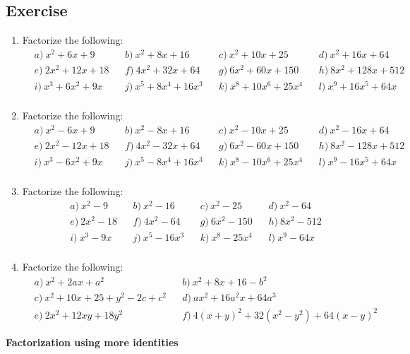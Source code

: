 \documentclass[12pt]{article}
\begin{document}
    \subsection*{Exercise}
    \begin{enumerate}
        \item Factorize the following:\begin{align*}
            &a)\ x^2+6x+9&&b)\ x^2+8x+16&&c)\ x^2+10x+25&&d)\ x^2+16x+64\\
            &e)\ 2x^2+12x+18&&f)\ 4x^2+32x+64&&g)\ 6x^2+60x+150&&h)\ 8x^2+128x+512\\
            &i)\ x^3+6x^2+9x&&j)\ x^5+8x^4+16x^3&&k)\ x^8+10x^6+25x^4&&l)\ x^9+16x^5+64x\\
        \end{align*}
        \item Factorize the following:\begin{align*}
            &a)\ x^2-6x+9&&b)\ x^2-8x+16&&c)\ x^2-10x+25&&d)\ x^2-16x+64\\
            &e)\ 2x^2-12x+18&&f)\ 4x^2-32x+64&&g)\ 6x^2-60x+150&&h)\ 8x^2-128x+512\\
            &i)\ x^3-6x^2+9x&&j)\ x^5-8x^4+16x^3&&k)\ x^8-10x^6+25x^4&&l)\ x^9-16x^5+64x\\
        \end{align*}
        \item Factorize the following:\begin{align*}
            &a)\ x^2-9&&b)\ x^2-16&&c)\ x^2-25&&d)\ x^2-64\\
            &e)\ 2x^2-18&&f)\ 4x^2-64&&g)\ 6x^2-150&&h)\ 8x^2-512\\
            &i)\ x^3-9x&&j)\ x^5-16x^3&&k)\ x^8-25x^4&&l)\ x^9-64x\\
        \end{align*}
        \item Factorize the following:\begin{align*}
            &a)\ x^2+2ax+a^2&&b)\ x^2+8x+16-b^2\\
            &c)\ x^2+10x+25+y^2-2c+c^2&&d)\ ax^2+16a^2x+64a^3\\
            &e)\ 2x^2+12xy+18y^2&&f)\ 4(x+y)^2+32(x^2-y^2)+64(x-y)^2
        \end{align*}
    \end{enumerate}

    \begin{center}
        \textbf{Factorization using more identities}
    \end{center}
\end{document}
